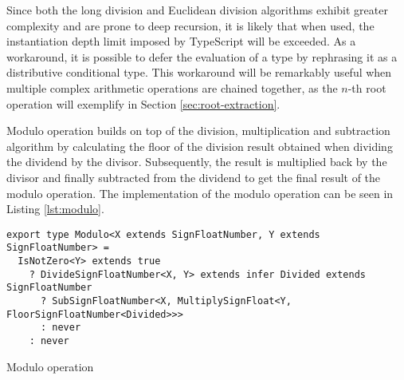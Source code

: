 Since both the long division and Euclidean division algorithms exhibit greater complexity and are prone to deep recursion, it is likely that when used, the instantiation depth limit imposed by TypeScript will be exceeded. As a workaround, it is possible to defer the evaluation of a type by rephrasing it as a distributive conditional type. This workaround will be remarkably useful when multiple complex arithmetic operations are chained together, as the $n$-th root operation will exemplify in Section \ref{sec:root-extraction}.

Modulo operation builds on top of the division, multiplication and subtraction algorithm by calculating the floor of the division result obtained when dividing the dividend by the divisor. Subsequently, the result is multiplied back by the divisor and finally subtracted from the dividend to get the final result of the modulo operation. The implementation of the modulo operation can be seen in Listing \ref{lst:modulo}.

\begin{listing}[ht]
  \begin{verbatim}
export type Modulo<X extends SignFloatNumber, Y extends SignFloatNumber> =
  IsNotZero<Y> extends true
    ? DivideSignFloatNumber<X, Y> extends infer Divided extends SignFloatNumber
      ? SubSignFloatNumber<X, MultiplySignFloat<Y, FloorSignFloatNumber<Divided>>>
      : never
    : never
  \end{verbatim}
  \caption{Modulo operation}\label{lst:modulo}
\end{listing}